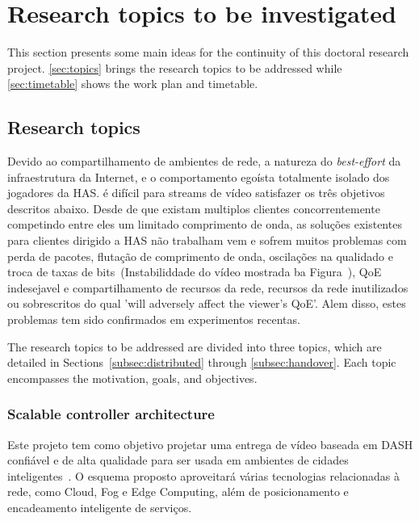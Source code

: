 \clearpage
\section{Research topics to be investigated}
\label{ch:proposal}

This section presents some main ideas for the continuity of this doctoral
research project. \autoref{sec:topics} brings the research topics to be
addressed while \autoref{sec:timetable} shows the work plan and timetable.

\subsection{Research topics}
\label{sec:topics}


Devido ao compartilhamento de ambientes de rede, a natureza do \textit{best-effort} da infraestrutura da Internet, e o comportamento egoísta totalmente isolado dos jogadores da HAS. é difícil para streams de vídeo satisfazer os três objetivos descritos abaixo. Desde de que existam multiplos clientes concorrentemente competindo entre eles um limitado comprimento de onda, as soluções existentes para clientes dirigido a HAS não trabalham vem e sofrem muitos problemas com perda de pacotes, flutação de comprimento de onda, oscilações na qualidado e troca de taxas de bits~(Instabiliddade do vídeo mostrada ba Figura~), QoE indesejavel e compartilhamento de recursos da rede, recursos da rede inutilizados ou sobrescritos do qual 'will adversely affect the viewer's QoE'. Alem disso, estes problemas tem sido confirmados em experimentos recentas. 

The research topics to be addressed are divided into three topics, which are
detailed in Sections~\ref{subsec:distributed} through \ref{subsec:handover}.
Each topic encompasses the motivation, goals, and objectives.

\subsubsection{Scalable controller architecture}
\label{subsec:}

Este projeto tem como objetivo projetar uma entrega de vídeo baseada em DASH confiável e de alta qualidade para ser usada em ambientes de cidades inteligentes~\cite{gamaUCC2019, KreuzbergerWorkshop2016}. O esquema proposto aproveitará várias tecnologias relacionadas à rede, como Cloud, Fog e Edge Computing, além de posicionamento e encadeamento inteligente de serviços.%

